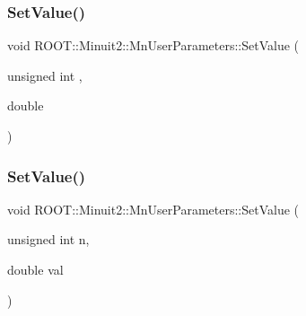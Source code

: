 \subsubsection{\texorpdfstring{SetValue()}{SetValue()}\hspace{0.1cm}{\footnotesize\ttfamily [1/4]}}
{\footnotesize\ttfamily void R\+O\+O\+T\+::\+Minuit2\+::\+Mn\+User\+Parameters\+::\+Set\+Value (\begin{DoxyParamCaption}\item[{unsigned int}]{,  }\item[{double}]{ }\end{DoxyParamCaption})}

\mbox{\label{classROOT_1_1Minuit2_1_1MnUserParameters_a6a2523d00c1b000fbc1c95da7a4a926a}} 
\subsubsection{\texorpdfstring{SetValue()}{SetValue()}\hspace{0.1cm}{\footnotesize\ttfamily [2/4]}}
{\footnotesize\ttfamily void R\+O\+O\+T\+::\+Minuit2\+::\+Mn\+User\+Parameters\+::\+Set\+Value (\begin{DoxyParamCaption}\item[{unsigned int}]{n,  }\item[{double}]{val }\end{DoxyParamCaption})}

